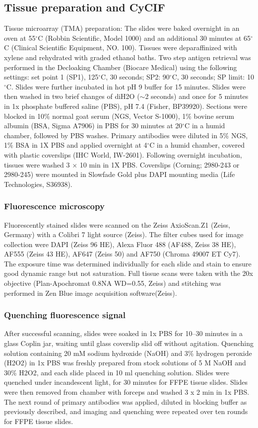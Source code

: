 \documentclass[preprint,review,3p,12pt]{elsarticle}
\begin{document}
\subsection{Tissue preparation and CyCIF}
Tissue microarray (TMA) preparation: The slides were baked overnight in an oven at 55$^\circ$C (Robbin Scientific, Model 1000) and an additional 30 minutes at 65$^\circ$C (Clinical Scientific Equipment, NO. 100). Tissues were deparaffinized with xylene and rehydrated with graded ethanol baths. Two step antigen retrieval was performed in the Decloaking Chamber (Biocare Medical) using the following settings: set point 1 (SP1), 125$^\circ$C, 30 seconds; SP2: 90$^\circ$C, 30 seconds; SP limit: 10$^\circ$C. Slides were further incubated in hot pH 9 buffer for 15 minutes. Slides were then washed in two brief changes of diH2O ($\sim$2 seconds) and once for 5 minutes in 1x phosphate buffered saline (PBS), pH 7.4 (Fisher, BP39920). Sections were blocked in 10\% normal goat serum (NGS, Vector S-1000), 1\% bovine serum albumin (BSA, Sigma A7906) in PBS for 30 minutes at 20$^\circ$C in a humid chamber, followed by PBS washes. Primary antibodies were diluted in 5\% NGS, 1\% BSA in 1X PBS and applied overnight at 4$^\circ$C in a humid chamber, covered with plastic coverslips (IHC World, IW-2601). Following overnight incubation, tissues were washed 3 $\times$ 10 min in 1X PBS. Coverslips (Corning; 2980-243 or 2980-245) were mounted in Slowfade Gold plus DAPI mounting media (Life Technologies, S36938).

\subsubsection{Fluorescence microscopy}
Fluorescently stained slides were scanned on the Zeiss AxioScan.Z1 (Zeiss, Germany) with a Colibri 7 light source (Zeiss). The filter cubes used for image collection were DAPI (Zeiss 96 HE), Alexa Fluor 488 (AF488, Zeiss 38 HE), AF555 (Zeiss 43 HE), AF647 (Zeiss 50) and AF750 (Chroma 49007 ET Cy7). The exposure time was determined individually for each slide and stain to ensure good dynamic range but not saturation. Full tissue scans were taken with the 20x objective (Plan-Apochromat 0.8NA WD=0.55, Zeiss) and stitching was performed in Zen Blue image acquisition software(Zeiss).

\subsubsection{Quenching fluorescence signal}
After successful scanning, slides were soaked in 1x PBS for 10–30 minutes in a glass Coplin jar, waiting until glass coverslip slid off without agitation. Quenching solution containing 20 mM sodium hydroxide (NaOH) and 3\% hydrogen peroxide (H2O2) in 1x PBS was freshly prepared from stock solutions of 5 M NaOH and 30\% H2O2, and each slide placed in 10 ml quenching solution. Slides were quenched under incandescent light, for 30 minutes for FFPE tissue slides. Slides were then removed from chamber with forceps and washed 3 x 2 min in 1x PBS. The next round of primary antibodies was applied, diluted in blocking buffer as previously described, and imaging and quenching were repeated over ten rounds for FFPE tissue slides.
\end{document}

